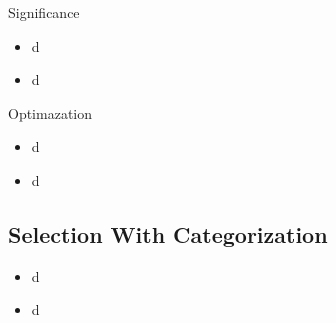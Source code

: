 \documentclass{beamer}
\begin{document}
\begin{frame}{Significance}
    \begin{itemize}
    \item
       d
    \item
        d
    \end{itemize}
    \begin{table}[htbp] %
    \centering
    \footnotesize%
    \setlength\tabcolsep{2pt}%
    \resizebox{\textwidth}{!}{%
        \begin{tabular}{|c | c |c|} 
         \hline
         process & preselection &  step1 \\%
         \hline
         \hline
         2Tau 3L & 3 tight lepton & 2 medium tau\\
         \hline
        \end{tabular}
    }
    \caption{Subchannel}
    \label{table:4}
    \end{table}   
\end{frame}



\begin{frame}{Optimazation}
    \begin{itemize}
    \item
       d
    \item
        d
    \end{itemize}
\end{frame}


\subsection{Selection With Categorization}


\begin{frame}{}
    \begin{itemize}
    \item
       d
    \item
        d
    \end{itemize}
\end{frame}
\end{document}
